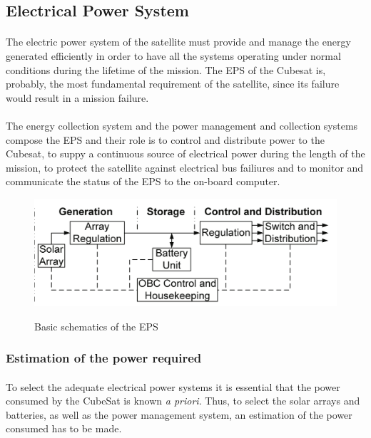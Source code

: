 \subsection{Electrical Power System}

\paragraph{}The electric power system of the satellite must provide and manage the energy generated efficiently in order to have all the systems operating under normal conditions during the lifetime of the mission. The EPS of the Cubesat is, probably, the most fundamental requirement of the satellite, since its failure would result in a mission failure. 

\paragraph{}The energy collection system and the power management and  collection systems compose the EPS and their role is to control and distribute power to the Cubesat, to suppy a continuous source of electrical power during the length of the mission, to protect the satellite against electrical bus failiures and to monitor and communicate the status of the EPS to the on-board computer.

\begin{figure}[h]
\includegraphics[scale=0.6]{./sections/SatelliteDesign/images/EPSschematics}
\centering
\caption{Basic schematics of the EPS} 
\cite{epsbasics}
\end{figure}

\subsubsection{Estimation of the power required}
\paragraph{}To select the adequate electrical power systems it is essential that the power consumed by the CubeSat is known \textit{a priori}. Thus, to select the solar arrays and batteries, as well as the power management system, an estimation of the power consumed has to be made.

